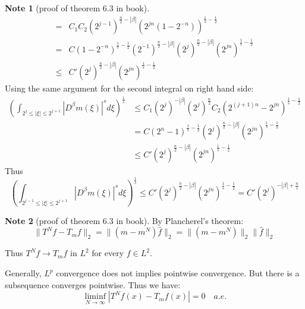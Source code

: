 \documentclass{report}
\theoremstyle{definition}
\newtheorem{note}{Note}
\theoremstyle{definition}
\theoremstyle{plain}
\numberwithin{theorem}{subsection}
\numberwithin{remark}{subsection}
\newcommand{\norm}[1]{\lVert#1\rVert}
\newcommand{\abs}[1]{\left\lvert#1\right\rvert}
\begin{document}
\begin{note}[proof of theorem 6.3 in book]
\begin{align*}
        =    & C_1C_2 (2^{j-1})^{\frac{n}{2}-\abs{\beta}}(2^{j n}(1-2^{-n}))^{\frac{1}{s}-\frac{1}{2}}                                                                    \\
        =    & C (1-2^{-n})^{\frac{1}{s}-\frac{1}{2}}(2^{-1})^{\frac{n}{2}-\abs{\beta}}(2^{j})^{\frac{n}{2}-\abs{\beta}}(2^{j n})^{\frac{1}{s}-\frac{1}{2}}               \\
        \leq & C'(2^{j})^{\frac{n}{2}-\abs{\beta}}(2^{j n})^{\frac{1}{s}-\frac{1}{2}}
    \end{align*}
    Using the same argument for the second integral on right hand side:
    \begin{align*}
        (\int_{2^{j}\leq \abs{\xi}\leq 2^{j+1}}\abs{D^\beta m(\xi)}^s d\xi)^{\frac{1}{s}} & \leq  C_1 (2^{j})^{-\abs{\beta}}(2^{j})^\frac{n}{2} C_2(2^{(j+1)n}-2^{j n})^{\frac{1}{s}-\frac{1}{2}}      \\
                                                                                          & =C (2^{n}-1)^{\frac{1}{s}-\frac{1}{2}}(2^{j})^{\frac{n}{2}-\abs{\beta}}(2^{j n})^{\frac{1}{s}-\frac{1}{2}} \\
                                                                                          & \leq C'(2^{j})^{\frac{n}{2}-\abs{\beta}}(2^{j n})^{\frac{1}{s}-\frac{1}{2}}
    \end{align*}
    Thus
    \begin{equation*}
        (\int_{2^{j-1}\leq \abs{\xi}\leq 2^{j+1}}\abs{D^\beta m(\xi)}^s d\xi)^{\frac{1}{s}} \leq  C'(2^{j})^{\frac{n}{2}-\abs{\beta}}(2^{j n})^{\frac{1}{s}-\frac{1}{2}}=C'(2^{j})^{-\abs{\beta}+\frac{n}{s}}
    \end{equation*}
\end{note}
\begin{note}[proof of theorem 6.3 in book]
    By Plancherel's theorem:
    \begin{equation*}
        \norm{T^Nf-T_mf}_2=\norm{(m-m^N)\hat{f}}_2=\norm{(m-m^N)}_2\norm{\hat{f}}_2
    \end{equation*}
\end{note}
Thus $T^Nf\to T_mf$ in $L^2$ for every $f\in L^2$.\par
Generally, $L^p$ convergence does not implies pointwise convergence. But there is a subsequence converges pointwise. Thus we have:
\begin{equation*}
    \liminf_{N\to \infty}\abs{T^Nf(x)-T_mf(x)}=0\quad a.e.
\end{equation*}
\end{document}
